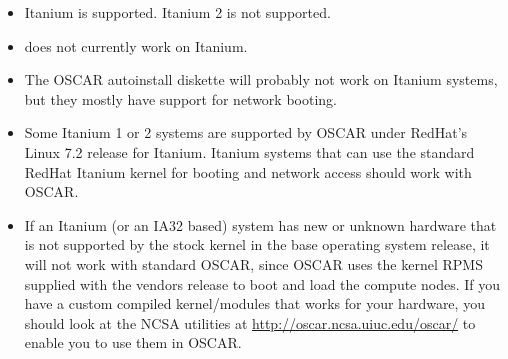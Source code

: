\begin{itemize}

\item Itanium is supported.  Itanium 2 is not supported.

\item {} does not currently work on Itanium.

\item The OSCAR autoinstall diskette will probably not work
on Itanium systems, but they mostly have support for network booting.

\item Some Itanium 1 or 2 systems are supported by OSCAR 
under RedHat's Linux 7.2 release for Itanium.
Itanium systems that can use the standard RedHat Itanium
kernel for booting and network access should work with OSCAR.

\item If an Itanium (or an IA32 based) system 
has new or unknown hardware that is not supported by
the stock kernel in the base operating system release,
it will not work with standard OSCAR, since OSCAR uses the
kernel RPMS supplied with the vendors release to boot and
load the compute nodes.
If you have a custom compiled kernel/modules that works
for your hardware, you should look at the NCSA utilities
at \url{http://oscar.ncsa.uiuc.edu/oscar/} to enable you
to use them in OSCAR.


\end{itemize}





